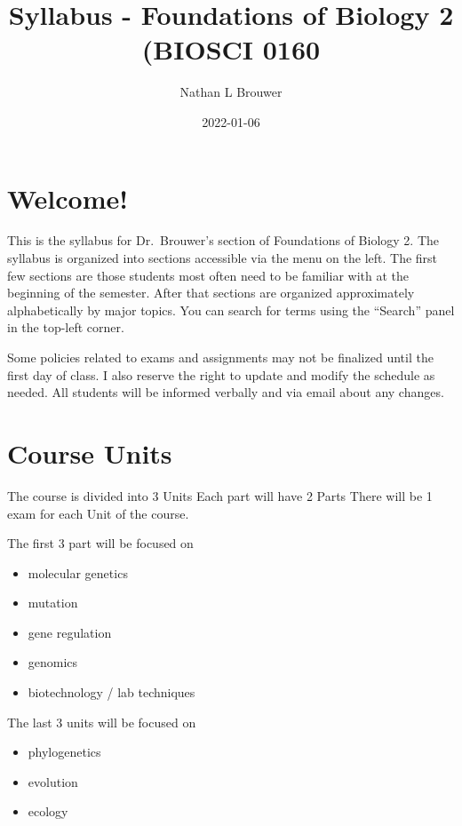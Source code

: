\documentclass[
]{book}
\title{Syllabus - Foundations of Biology 2 (BIOSCI 0160}
\author{Nathan L Brouwer}
\date{2022-01-06}
\providecommand{\tightlist}{%
  \setlength{\itemsep}{0pt}\setlength{\parskip}{0pt}}
\begin{document}
\maketitle

{
\setcounter{tocdepth}{1}
\tableofcontents
}
\hypertarget{welcome}{%
\chapter{Welcome!}\label{welcome}}

This is the syllabus for Dr.~Brouwer's section of Foundations of Biology 2. The syllabus is organized into sections accessible via the menu on the left. The first few sections are those students most often need to be familiar with at the beginning of the semester. After that sections are organized approximately alphabetically by major topics. You can search for terms using the ``Search'' panel in the top-left corner.

Some policies related to exams and assignments may not be finalized until the first day of class. I also reserve the right to update and modify the schedule as needed. All students will be informed verbally and via email about any changes.

\hypertarget{course-units}{%
\chapter{Course Units}\label{course-units}}

The course is divided into 3 Units Each part will have 2 Parts
There will be 1 exam for each Unit of the course.

The first 3 part will be focused on

\begin{itemize}
\tightlist
\item
  molecular genetics
\item
  mutation
\item
  gene regulation
\item
  genomics
\item
  biotechnology / lab techniques
\end{itemize}

The last 3 units will be focused on

\begin{itemize}
\tightlist
\item
  phylogenetics
\item
  evolution
\item
  ecology
\end{itemize}
\end{document}
